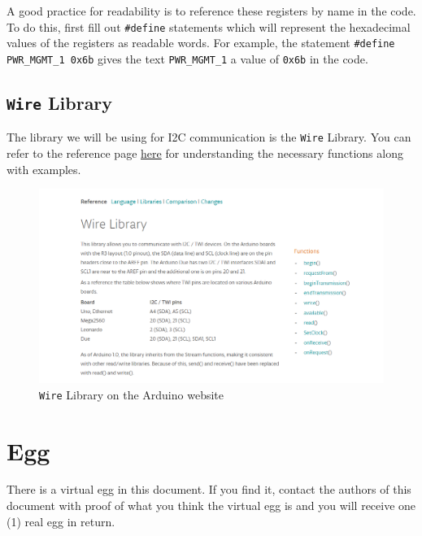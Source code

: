 \documentclass{article}
\begin{document}
        A good practice for readability is to reference these registers by name in the code. To do this, first fill out \texttt{\#define} statements which will represent the hexadecimal values of the registers as readable words. For example, the statement \texttt{\#define PWR\_MGMT\_1 0x6b} gives the text \texttt{PWR\_MGMT\_1} a value of \texttt{0x6b} in the code.  
        
    \subsection{\texttt{Wire} Library}
        The library we will be using for I2C communication is the \texttt{Wire} Library. You can refer to the reference page \href{https://www.arduino.cc/en/reference/wire}{here} for understanding the necessary functions along with examples.
        
        \begin{figure}[ht]
            \centering
            \includegraphics[width = 1.0\textwidth]{img/WireLibrary.PNG}
            \caption{\texttt{Wire} Library on the Arduino website}
        \end{figure}

\section{Egg}
    There is a virtual egg in this document. If you find it, contact the authors of this document with proof of what you think the virtual egg is and you will receive one (1) real egg in return. 
\end{document}
